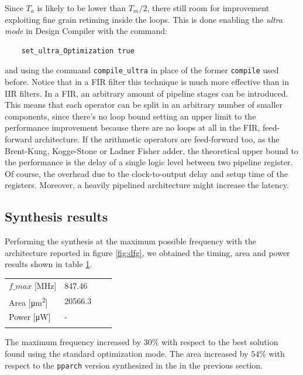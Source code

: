 \documentclass[a4paper]{article}
\begin{document}
Since $T_a$ is likely to be lower than $T_m/2$, there still room for improvement exploiting fine grain retiming inside the loops. This is done enabling the \textit{ultra mode} in Design Compiler with the command:
\begin{verbatim}
	set_ultra_Optimization true
\end{verbatim}
and using the command \texttt{compile\_ultra} in place of the former \texttt{compile} used before. Notice that in a FIR filter this technique is much more effective than in IIR filters. In a FIR, an arbitrary amount of pipeline stages can be introduced. This means that each operator can be split in an arbitrary number of smaller components, since there's no loop bound setting an upper limit to the performance improvement because there are no loops at all in the FIR, feed-forward architecture. If the arithmetic operators are feed-forward too, as the Brent-Kung, Kogge-Stone or Ladner Fisher adder, the theoretical upper bound to the performance is the delay of a single logic level between two pipeline register. Of course, the overhead due to the clock-to-output delay and setup time of the registers. Moreover, a heavily pipelined architecture might increase the latency. 

\subsection{Synthesis results}
Performing the synthesis at the maximum possible frequency with the architecture reported in figure \ref{fig:dfg}, we obtained the timing, area and power results shown in table \ref{tab:ret_res}.

\begin{table}[hbtp]
	\centering
	\begin{tabular}{|l|l|ll} 
	\cline{1-2}
	$f\_max$ [\si{\mega\hertz}{}]           & 847.46               &  &   \\ 
	\cline{1-2}
	Area [\si{\micro\meter^2}{}]                & 20566.3              &  &   \\ 
	\cline{1-2}
	Power [\si{\micro\watt}{}]               & -                    &  &   \\ 
	\cline{1-2}
	\multicolumn{1}{l}{} & \multicolumn{1}{l}{} &  &  
	\end{tabular}
	\label{tab:ret_res}
\end{table}

The maximum frequency increased by $30\%$ with respect to the best solution found using the standard optimization mode. The area increased by $54\%$ with respect to the \texttt{pparch} version synthesized in the in the previous section. 
\end{document}
